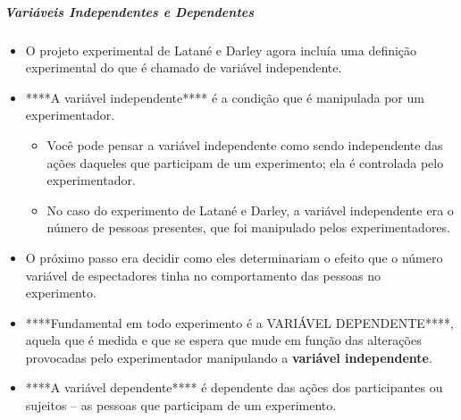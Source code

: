 \documentclass[
]{book}
\providecommand{\tightlist}{%
  \setlength{\itemsep}{0pt}\setlength{\parskip}{0pt}}
\begin{document}
\hypertarget{variuxe1veis-independentes-e-dependentes}{%
\subparagraph{Variáveis Independentes e
Dependentes}\label{variuxe1veis-independentes-e-dependentes}}

\begin{itemize}
\tightlist
\item
  O projeto experimental de Latané e Darley agora incluía uma definição
  experimental do que é chamado de variável independente.
\item
  ****A variável independente**** é a condição que é manipulada por um
  experimentador.

  \begin{itemize}
  \tightlist
  \item
    Você pode pensar a variável independente como sendo independente das
    ações daqueles que participam de um experimento; ela é controlada
    pelo experimentador.
  \item
    No caso do experimento de Latané e Darley, a variável independente
    era o número de pessoas presentes, que foi manipulado pelos
    experimentadores.
  \end{itemize}
\item
  O próximo passo era decidir como eles determinariam o efeito que o
  número variável de espectadores tinha no comportamento das pessoas no
  experimento.
\item
  ****Fundamental em todo experimento é a VARIÁVEL DEPENDENTE****,
  aquela que é medida e que se espera que mude em função das alterações
  provocadas pelo experimentador manipulando a \textbf{variável
  independente}.
\item
  ****A variável dependente**** é dependente das ações dos participantes
  ou sujeitos -- as pessoas que participam de um experimento.


\end{itemize}
\end{document}
